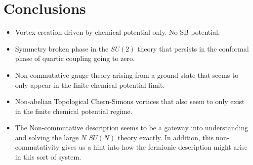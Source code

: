 
\chapter{Conclusions}

\begin{itemize}
    \item Vortex creation driven by chemical potential only. No SB potential.
    \item Symmetry broken phase in the $SU(2)$ theory that persists in the conformal phase of quartic coupling going to zero.
    \item Non-commutative gauge theory arising from a ground state that seems to only appear in the finite chemical potential limit.
    \item Non-abelian Topological Chern-Simons vortices that also seem to only exist in the finite chemical potential regime.
    \item The Non-commutative description seems to be a gateway into understanding and solving the large $N$ $SU(N)$ theory exactly. In addition, this non-commutativity gives us a hint into how the fermionic description might arise in this sort of system.
\end{itemize}
